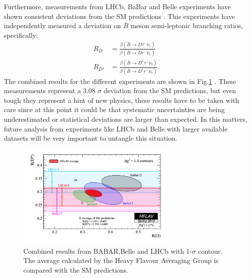 Furthermore, measurements from LHCb, BaBar and Belle experiments have shown consistent deviations from the SM predictions \cite{Ciezarek_2017}. This experiments have independently measured a deviation on $\bar{B}$ meson semi-leptonic branching ratios, specifically:
\begin{align}
	R_D&=\frac{\beta(\bar{B}\to D\tau^-\bar{\nu}_\tau)}{\beta(\bar{B}\to De^-\bar{\nu}_e)}
	\\
	R_{D^\star}&=\frac{\beta(\bar{B}\to D^\star\tau^-\bar{\nu}_\tau)}{\beta(\bar{B}\to D^\star e^-\bar{\nu}_e)}.
\end{align}
The combined results for the different experiments are shown in Fig.\ref{Fig3} . These measurements represent a 3.08 $\sigma$
 deviation from the SM predictions, but even tough they represent a hint of new physics, these results have to be taken with care since at this point it could be that systematic uncertainties are being underestimated or statistical deviations are larger than expected. In this matters, future analysis from experiments like LHCb and Belle with larger available datasets will be very important to untangle this situation.
 \begin{figure}[h]
 	\centering
 	\includegraphics[width=0.7\textwidth]{figures/Fig3}
 	\caption{Combined results from BABAR,Belle and LHCb with 1-$\sigma$ contour. The average calculated by the Heavy Flavour Averaging Group \cite{HFAG}  is compared with the SM predictions.}
 	\label{Fig3}
 \end{figure}